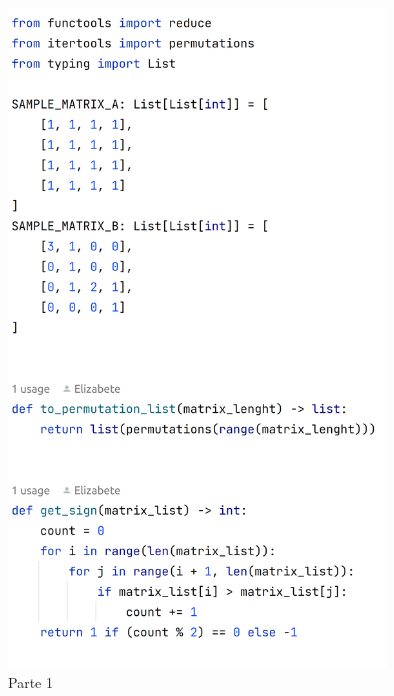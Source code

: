 \documentclass[a4paper,12pt]{article}
\begin{document}
\begin{figure}[h!]
\centering
\includegraphics[width=10cm,]{code_01.png}
\caption{Parte 1}
\label{Rótulo}
\end{figure}
\end{document}
